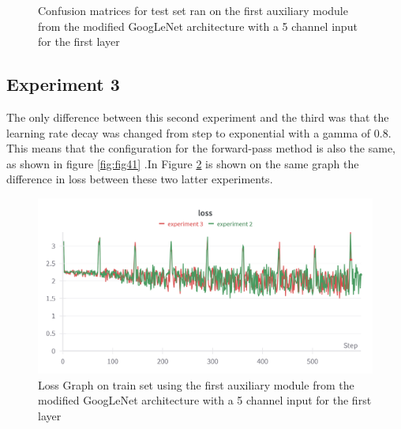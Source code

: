 \begin{figure}[!ht]
    \caption{Confusion matrices for test set ran on the first auxiliary module from the modified GoogLeNet architecture with a 5 channel input for the first layer}
    \label{fig:fig11}
\end{figure}

\subsection{Experiment 3}

The only difference between this second experiment and the third was that the learning rate decay was changed from step to exponential with a gamma of 0.8. This means that the configuration for the forward-pass method is also the same, as shown in figure \ref{fig:fig41} .In Figure \ref{fig:fig13} is shown on the same graph the difference in loss between these two latter experiments.

\begin{figure}[!ht]
    \centering
    \includegraphics[width=1\textwidth]{figures/Figure14.png}
    \caption{Loss Graph on train set using the first auxiliary module from the modified GoogLeNet architecture with a 5 channel input for the first layer}
    \label{fig:fig13}
\end{figure}

